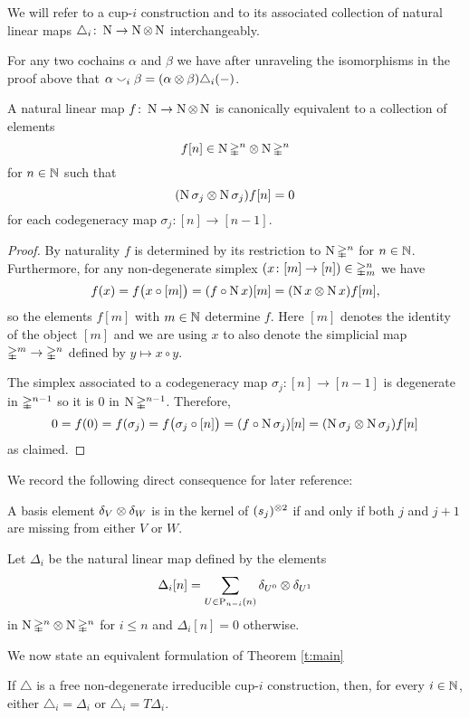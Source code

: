 We will refer to a cup-$i$ construction and to its associated collection of natural linear maps $\triangle_i \colon \operatorname{N} \to \operatorname{N} \otimes \operatorname{N}$ interchangeably.

\begin{remark}
	For any two cochains $\alpha$ and $\beta$ we have after unraveling the isomorphisms in the proof above that $\alpha \smallsmile_i \beta = (\alpha \otimes \beta) \triangle_i(-)$.
\end{remark}

\begin{lemma}
	A natural linear map $f \colon \operatorname{N} \to \operatorname{N} \otimes \operatorname{N}$ is canonically equivalent to a collection of elements
	\[
	f[n] \in \operatorname{N} \mathbb{\Delta}^n \otimes \operatorname{N} \mathbb{\Delta}^n
	\]
	for $n \in \mathbb{N}$ such that
	\[
	(\operatorname{N} \sigma_j \otimes \operatorname{N} \sigma_j) f[n] = 0
	\]
	for each codegeneracy map $\sigma_j \colon [n] \to [n-1]$.
\end{lemma}

\begin{proof}
	By naturality $f$ is determined by its restriction to $\operatorname{N} \mathbb{\Delta}^n$ for $n \in \mathbb{N}$.
	Furthermore, for any non-degenerate simplex $(x \colon [m] \to [n]) \in \mathbb{\Delta}^n_m$ we have
	\[
	f(x) = f \big( x \circ [m] \big) =
	(f \circ \operatorname{N} x) [m] =
	(\operatorname{N} x \otimes \operatorname{N} x) f [m],
	\]
	so the elements $f[m]$ with $m \in \mathbb{N}$ determine $f$.
	Here $[m]$ denotes the identity of the object $[m]$ and we are using $x$ to also denote the simplicial map $\mathbb{\Delta}^m \to \mathbb{\Delta}^n$ defined by $y \mapsto x \circ y$.

	The simplex associated to a codegeneracy map $\sigma_j \colon [n] \to [n-1]$ is degenerate in $\mathbb{\Delta}^{n-1}$ so it is $0$ in $\operatorname{N} \mathbb{\Delta}^{n-1}$.
	Therefore,
	\[
	0 = f(0) = f(\sigma_j) =
	f \big( \sigma_j \circ [n] \big) =
	(f \circ \operatorname{N} \sigma_j) [n] =
	(\operatorname{N} \sigma_j \otimes \operatorname{N} \sigma_j) f [n]
	\]
	as claimed.
\end{proof}

We record the following direct consequence for later reference:

\begin{lemma} \label{l:condition to be in the kernel of s}
	A basis element $\delta_V \otimes \delta_W$ is in the kernel of $(s_j)^{\otimes 2}$ if and only if both $j$ and $j+1$ are missing from either $V$ or $W$.
\end{lemma}

\begin{definition}
	Let $\Delta_i$ be the natural linear map defined by the elements
	\[
	\Delta_i [n] =
	\sum_{U \in \mathrm{P}_{n-i}(n)} \delta_{U^0} \otimes \delta_{U^1}
	\]
	in $\operatorname{N} \mathbb{\Delta}^n \otimes \operatorname{N} \mathbb{\Delta}^n$
	for $i \leq n$ and $\Delta_i [n] = 0$ otherwise.
\end{definition}

We now state an equivalent formulation of Theorem \ref{t:main}

\begin{theorem} \label{t:main reformulated}
	If $\triangle$ is a free non-degenerate irreducible cup-$i$ construction, then, for every $i \in \mathbb{N}$, either $\triangle_i = \Delta_i$ or $\triangle_i = T \Delta_i$.
\end{theorem}
